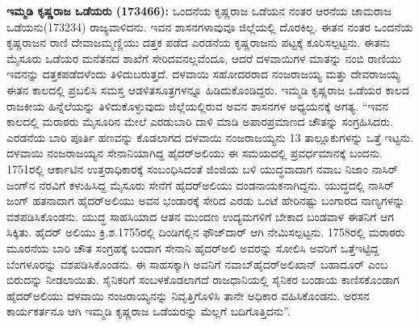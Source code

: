 \textbf{ ಇಮ್ಮಡಿ ಕೃಷ್ಣರಾಜ ಒಡೆಯರು (173466): } ಒಂದನೆಯ ಕೃಷ್ಣರಾಜ ಒಡೆಯನ ನಂತರ ಆರನೆಯ ಚಾಮರಾಜ ಒಡೆಯನು(173234) ರಾಜ್ಯವಾಳಿದನು. ಇವನ ಶಾಸನಗಳಾವುವೂ ಜಿಲ್ಲೆಯಲ್ಲಿ ದೊರಕಿಲ್ಲ. ಈತನ ನಂತರ ಒಂದನೆಯ ಕೃಷ್ಣರಾಜನ ರಾಣಿ ದೇವಾಜಮ್ಮಣ್ಣಿಯು ದತ್ತಕ ಪಡೆದ ಎರಡನೆಯ ಕೃಷ್ಣರಾಜನು ಪಟ್ಟಕ್ಕೆ ಕೂರಿಸಲ್ಪಟ್ಟನು. ಈತನು ಮೈಸೂರು ಒಡೆಯರ ಮನೆತನದ ಶಾಖೆಗೆ ಸೇರಿದವನಲ್ಲವೆಂದೂ, ಆದರೆ ದಳವಾಯಿಗಳ ಮಾತನ್ನು ನಂಬಿ ರಾಣಿಯು ಇವನನ್ನು ದತ್ತಕಪಡೆದಳೆಂದು ತಿಳಿದುಬರುತ್ತದೆ. ದಳವಾಯಿ ಸಹೋದರರಾದ ನಂಜರಾಜಯ್ಯ ಮತ್ತು ದೇವರಾಜಯ್ಯ ಈತನ ಕಾಲದಲ್ಲಿ ಪ್ರಬಲಿಸಿ ಸಮಸ್ತ ಆಡಳಿತಸೂತ್ರಗಳನ್ನೂ ಹಿಡಿದುಕೊಂಡಿದ್ದರು. ಇಮ್ಮಡಿ ಕೃಷ್ಣರಾಜ ಒಡೆಯರ ಕಾಲದ ರಾಜಕೀಯ ಹಿನ್ನೆಲೆಯನ್ನು ತಿಳಿದುಕೊಳ್ಳುವುದು ಜಿಲ್ಲೆಯಲ್ಲಿರುವ ಅವನ ಶಾಸನಗಳ ಅಧ್ಯಯನಕ್ಕೆ ಅಗತ್ಯ. “ಇವನ ಕಾಲದಲ್ಲಿ ಮರಾಠರು ಮೈಸೂರಿನ ಮೇಲೆ ಎರಡುಬಾರಿ ದಾಳಿ ಮಾಡಿ ಅಪಾರಪ್ರಮಾಣದ ಚೌತನ್ನು ಸಂಗ್ರಹಿಸಿದರು. ಎರಡನೆಯ ಬಾರಿ ಪೂರ್ತಿ ಹಣವನ್ನು ಕೊಡಲಾಗದ ದಳವಾಯಿ ನಂಜರಾಜಯ್ಯನು 13 ತಾಲ್ಲೂಕುಗಳನ್ನು ಒತ್ತೆ ಇಟ್ಟನು. ದಳವಾಯಿ ನಂಜರಾಜಯ್ಯನ ಸೇನಾನಿಯಾಗಿದ್ದ ಹೈದರ್​ಅಲಿಯು ಈ ಸಮಯದಲ್ಲಿ ಪ್ರವರ್ಧಮಾನಕ್ಕೆ ಬಂದನು. 1751ರಲ್ಲಿ ಆರ್ಕಾಟಿನ ಉತ್ತರಾಧಿಕಾರಕ್ಕೆ ಸಂಬಂಧಿಸಿದಂತೆ ಜಿಂಜಿಯ ಬಳಿ ಯುದ್ಧವಾದಾಗ ನವಾಬ ನಿಜಾಂ ನಾಸಿರ್​ಜಂಗ್​ನ ನೆರವಿಗೆ ಕಳುಹಿಸಿದ್ದ ಮೈಸೂರು ಸೇನೆಗೆ ಹೈದರ್​ಅಲಿಯು ದಂಡನಾಯಕನಾಗಿದ್ದನು. ಯುದ್ಧದಲ್ಲಿ ನಾಸಿರ್​ಜಂಗ್​ ಹತನಾದಾಗ ಹೈದರ್​ಅಲಿಯು ಅವನ ಭಂಡಾರಕ್ಕೆ ಸೇರಿದ ಎರಡು ಒಂಟೆ ಹೇರಿನಷ್ಟು ಬಂಗಾರದ ನಾಣ್ಯಗಳನ್ನು ವಶಪಡಿಸಿಕೊಂಡನು. ಯುದ್ಧ ಸಾಹಸಿಯಾದ ಆತನ ಮುಂದಣ ಉದ್ಯಮಗಳಿಗೆ ಬೇಕಾದ ಬಂಡವಾಳ ಈತನಿಗೆ ಆಗ ಸಿಕ್ಕಿತು. ಹೈದರ್​ ಅಲಿಯು ಕ್ರಿ.ಶ.1755ರಲ್ಲಿ ದಿಂಡಿಗಲ್ಲಿನ ಫೌಜ್​ದಾರ್​ ಆಗಿ ನೇಮಿಸಲ್ಪಟ್ಟನು. 1758ರಲ್ಲಿ ಮರಾಠರು ಮೂರನೆಯ ಬಾರಿ ಚೌತ ಸಂಗ್ರಹಕ್ಕೆ ಬಂದಾಗ ಸೇನಾನಿ ಹೈದರ್​ಅಲಿ ಅವರನ್ನು ಸೋಲಿಸಿ ಅವರಿಗೆ ಒತ್ತೆಇಟ್ಟಿದ್ದ ಬೆಂಗಳೂರನ್ನು ವಶಪಡಿಸಿಕೊಂಡನು. ಈ ಸಾಹಸಕ್ಕಾಗಿ ಅವನಿಗೆ ನವಾಬ್​ ಹೈದರ್​ಅಲಿಖಾನ್​ ಬಹಾದೂರ್​ ಎಂಬ ಬಿರುದನ್ನು ನೀಡಲಾಯಿತು. ಸೈನಿಕರಿಗೆ ಸಂಬಳಕೊಡಲಾಗದೆ ರಾಜಧಾನಿಯಲ್ಲಿ ಸೈನಿಕರ ಬಂಡಾಯ ಕಾಣಿಸಕೊಂಡಾಗ ಹೈದರ್​ಅಲಿಯು ದಳವಾಯಿ ನಂಜರಾಯ್ಯನನ್ನು ನಿವೃತ್ತಿಗೊಳಿಸಿ ತಾನೇ ಅಧಿಕಾರ ವಹಿಸಿಕೊಂಡನು. ಅರಸನ ಕಾರ್ಯಕರ್ತನೂ ಆಗಿ ಇಮ್ಮಡಿ ಕೃಷ್ಣರಾಜ ಒಡೆಯರನ್ನು ಮೆಲ್ಲಗೆ ಬದಿಗೊತ್ತಿದನು”.

